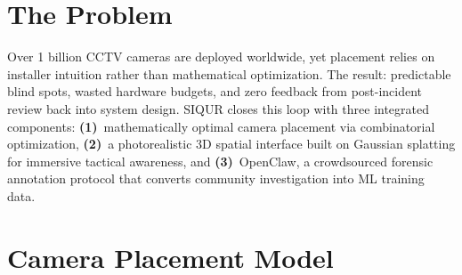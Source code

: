 \documentclass[9pt,letterpaper,twocolumn]{extarticle}
\begin{document}

\section*{The Problem}

Over 1 billion CCTV cameras are deployed worldwide, yet placement relies on installer intuition rather than mathematical optimization. The result: predictable blind spots, wasted hardware budgets, and zero feedback from post-incident review back into system design. SIQUR closes this loop with three integrated components: \textbf{(1)}~mathematically optimal camera placement via combinatorial optimization, \textbf{(2)}~a photorealistic 3D spatial interface built on Gaussian splatting for immersive tactical awareness, and \textbf{(3)}~OpenClaw, a crowdsourced forensic annotation protocol that converts community investigation into ML training data.

\section*{Camera Placement Model}
\end{document}
